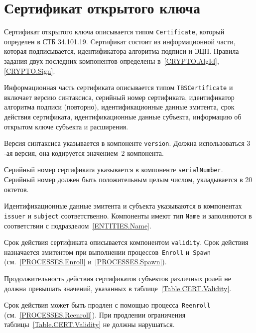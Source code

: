 \section{Сертификат открытого ключа}\label{FMT.Cert}

Сертификат открытого ключа описывается типом 
\texttt{Certificate}, который определен в СТБ 34.101.19.
%
Cертификат состоит из информационной части, которая 
подписывается, идентификатора алгоритма подписи и ЭЦП. 
Правила задания двух последних компонентов определены 
в~\ref{CRYPTO.AlgId}, \ref{CRYPTO.Sign}.

Информационная часть сертификата описывается типом 
\texttt{TBSCertificate} и включает версию синтаксиса, 
серийный номер сертификата, идентификатор алгоритма подписи (повторно), 
идентификационные данные эмитента, срок действия сертификата, 
идентификационные данные субъекта, информацию об открытом ключе 
субъекта и расширения. 

Версия синтаксиса указывается в компоненте \texttt{version}.
Должна использоваться $3$-ая версия, она кодируется значением~$2$
компонента.

Серийный номер сертификата указывается в компоненте \texttt{serialNumber}.
Серийный номер должен быть положительным целым числом, 
 укладывается в 20 октетов.
%

Идентификационные данные эмитента и субъекта указываются в компонентах 
\texttt{issuer} и \texttt{subject} соответственно. Компоненты 
имеют тип \texttt{Name} и заполняются в соответствии с 
подразделом~\ref{ENTITIES.Name}. 

Срок действия сертификата описывается компонентом 
\texttt{validity}. Срок действия назначается эмитентом
при выполнении процессов~\texttt{Enroll} и~\texttt{Spawn}
(см.~\ref{PROCESSES.Enroll} и~\ref{PROCESSES.Spawn}). 


Продолжительность действия сертификатов субъектов различных ролей
не должна превышать значений, указанных в таблице~\ref{Table.CERT.Validity}. 
%

Срок действия может быть продлен с помощью процесса~\texttt{Reenroll}
(см.~\ref{PROCESSES.Reenroll}). При продлении ограничения
таблицы~\ref{Table.CERT.Validity} не должны нарушаться.

